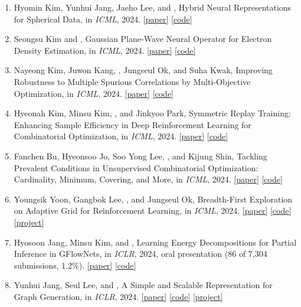\begin{enumerate}
\item Hyomin Kim, Yunhui Jang, Jaeho Lee, and , Hybrid Neural Representations for Spherical Data, in \textit{ICML}, 2024. \mbox{\href{https://arxiv.org/abs/2402.05965}{[paper]}} \mbox{\href{https://github.com/icecream126/HNeR-S/tree/main}{[code]}}
\item Seongsu Kim and , Gaussian Plane-Wave Neural Operator for Electron Density Estimation, in \textit{ICML}, 2024. \mbox{\href{https://arxiv.org/abs/2402.04278}{[paper]}} \mbox{\href{https://github.com/seongsukim-ml/GPWNO}{[code]}}
\item Nayeong Kim, Juwon Kang, , Jungseul Ok, and Suha Kwak, Improving Robustness to Multiple Spurious Correlations by Multi-Objective Optimization, in \textit{ICML}, 2024. \mbox{\href{https://arxiv.org/abs/2409.03303}{[paper]}} \mbox{\href{https://github.com/Nayeong-V-Kim/multiple_spurious_correlation_by_MOO}{[code]}}
\item Hyeonah Kim, Minsu Kim, , and Jinkyoo Park, Symmetric Replay Training: Enhancing Sample Efficiency in Deep Reinforcement Learning for Combinatorial Optimization, in \textit{ICML}, 2024. \mbox{\href{https://arxiv.org/abs/2306.01276}{[paper]}} \mbox{\href{https://github.com/kaist-silab/symmetric_replay}{[code]}}
\item Fanchen Bu, Hyeonsoo Jo, Soo Yong Lee, , and Kijung Shin, Tackling Prevalent Conditions in Unsupervised Combinatorial Optimization: Cardinality, Minimum, Covering, and More, in \textit{ICML}, 2024. \mbox{\href{https://arxiv.org/abs/2405.08424}{[paper]}} \mbox{\href{https://github.com/ai4co/unsupervised-CO-ucom2}{[code]}}
\item Youngsik Yoon, Gangbok Lee, , and Jungseul Ok, Breadth-First Exploration on Adaptive Grid for Reinforcement Learning, in \textit{ICML}, 2024. \mbox{\href{https://proceedings.mlr.press/v235/yoon24d.html}{[paper]}} \mbox{\href{https://github.com/ml-postech/BEAG}{[code]}} \mbox{\href{https://youngsikyoon.github.io/BEAG/}{[project]}}
\item Hyosoon Jang, Minsu Kim, and , Learning Energy Decompositions for Partial Inference in GFlowNets, in \textit{ICLR}, 2024, \textcolor{WineRed}{oral presentation (86 of 7,304 submissions, 1.2\%)}. \mbox{\href{https://arxiv.org/abs/2310.03301}{[paper]}} \mbox{\href{https://github.com/hsjang0/LED-GFN}{[code]}}
\item Yunhui Jang, Seul Lee, and , A Simple and Scalable Representation for Graph Generation, in \textit{ICLR}, 2024. \mbox{\href{https://arxiv.org/abs/2312.02230}{[paper]}} \mbox{\href{https://github.com/yunhuijang/GEEL}{[code]}} \mbox{\href{https://yunhuijang.github.io/projects/GEEL/}{[project]}}

\end{enumerate}

